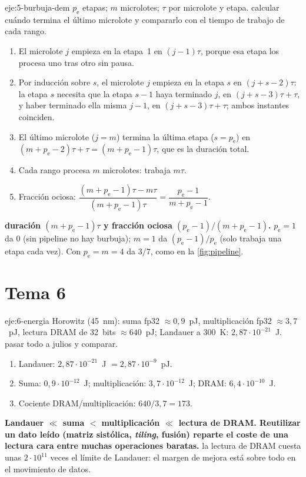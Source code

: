 \begin{solucion}{eje:5-burbuja-dem}
\datos $p_{\mathrm{e}}$ etapas; $m$ microlotes; $\tau$ por microlote y etapa.
\planteamiento calcular cuándo termina el último microlote y compararlo con el tiempo de trabajo de cada rango.
\pasos
\begin{enumerate}[label=\arabic*.]
  \item El microlote $j$ empieza en la etapa~1 en $(j-1)\tau$, porque esa etapa los procesa uno tras otro sin pausa.
  \item Por inducción sobre $s$, el microlote $j$ empieza en la etapa $s$ en $(j+s-2)\tau$: la etapa $s$ necesita que la etapa $s-1$ haya terminado $j$, en $(j+s-3)\tau+\tau$, y haber terminado ella misma $j-1$, en $(j+s-3)\tau+\tau$; ambos instantes coinciden.
  \item El último microlote ($j=m$) termina la última etapa ($s=p_{\mathrm{e}}$) en $(m+p_{\mathrm{e}}-2)\tau+\tau=(m+p_{\mathrm{e}}-1)\tau$, que es la duración total.
  \item Cada rango procesa $m$ microlotes: trabaja $m\tau$.
  \item Fracción ociosa: $\dfrac{(m+p_{\mathrm{e}}-1)\tau-m\tau}{(m+p_{\mathrm{e}}-1)\tau}=\dfrac{p_{\mathrm{e}}-1}{m+p_{\mathrm{e}}-1}$. \qedhere
\end{enumerate}
\resultado \textbf{duración $(m+p_{\mathrm{e}}-1)\tau$ y fracción ociosa $(p_{\mathrm{e}}-1)/(m+p_{\mathrm{e}}-1)$.}
\comprobacion $p_{\mathrm{e}}=1$ da $0$ (sin pipeline no hay burbuja); $m=1$ da $(p_{\mathrm{e}}-1)/p_{\mathrm{e}}$ (solo trabaja una etapa cada vez). Con $p_{\mathrm{e}}=m=4$ da $3/7$, como en la \cref{fig:pipeline}.
\end{solucion}

\section{Tema 6}

\begin{solucion}{eje:6-energia}
\datos Horowitz (45~nm): suma fp32 $\approx 0{,}9$~pJ, multiplicación fp32 $\approx 3{,}7$~pJ, lectura DRAM de 32~bits $\approx 640$~pJ; Landauer a 300~K: $2{,}87\cdot 10^{-21}$~J.
\planteamiento pasar todo a julios y comparar.
\pasos
\begin{enumerate}[label=\arabic*.]
  \item Landauer: $2{,}87\cdot 10^{-21}$~J $=2{,}87\cdot 10^{-9}$~pJ.
  \item Suma: $0{,}9\cdot 10^{-12}$~J; multiplicación: $3{,}7\cdot 10^{-12}$~J; DRAM: $6{,}4\cdot 10^{-10}$~J.
  \item Cociente DRAM/multiplicación: $640/3{,}7=173$.
\end{enumerate}
\resultado \textbf{Landauer $\ll$ suma $<$ multiplicación $\ll$ lectura de DRAM. Reutilizar un dato leído (matriz sistólica, \emph{tiling}, fusión) reparte el coste de una lectura cara entre muchas operaciones baratas.}
\comprobacion la lectura de DRAM cuesta unas $2\cdot 10^{11}$ veces el límite de Landauer: el margen de mejora está sobre todo en el movimiento de datos.
\end{solucion}


